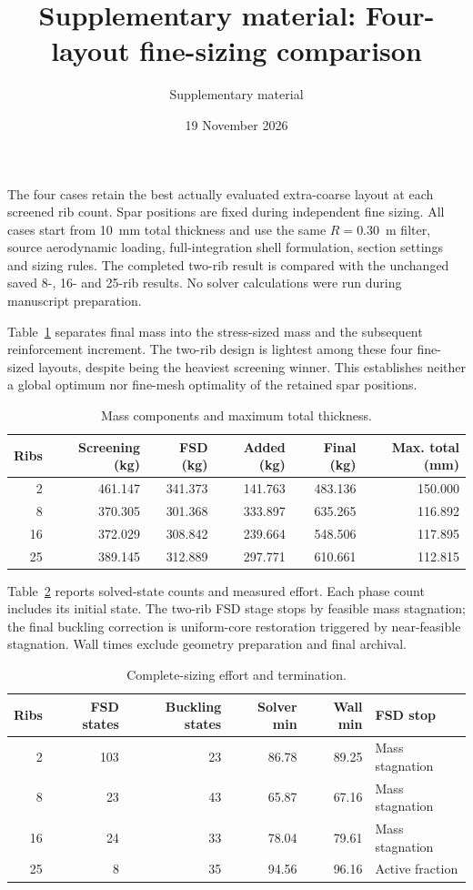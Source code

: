 \documentclass[11pt,a4paper]{article}
\title{Supplementary material: Four-layout fine-sizing comparison}
\author{Supplementary material}\date{19 November 2026}
\begin{document}
\maketitle
The four cases retain the best actually evaluated extra-coarse layout at each screened rib count. Spar positions are fixed during independent fine sizing. All cases start from 10~mm total thickness and use the same $R=0.30$~m filter, source aerodynamic loading, full-integration shell formulation, section settings and sizing rules. The completed two-rib result is compared with the unchanged saved 8-, 16- and 25-rib results. No solver calculations were run during manuscript preparation.

Table~\ref{tab:mass} separates final mass into the stress-sized mass and the subsequent reinforcement increment. The two-rib design is lightest among these four fine-sized layouts, despite being the heaviest screening winner. This establishes neither a global optimum nor fine-mesh optimality of the retained spar positions.
\begin{table}[h]\centering\small
\caption{Mass components and maximum total thickness.}\label{tab:mass}
\begin{tabular}{rrrrrr}\toprule
Ribs & Screening (kg) & FSD (kg) & Added (kg) & Final (kg) & Max. total (mm)\\\midrule
2 & 461.147 & 341.373 & 141.763 & 483.136 & 150.000\\
8 & 370.305 & 301.368 & 333.897 & 635.265 & 116.892\\
16 & 372.029 & 308.842 & 239.664 & 548.506 & 117.895\\
25 & 389.145 & 312.889 & 297.771 & 610.661 & 112.815\\
\bottomrule\end{tabular}\end{table}

Table~\ref{tab:effort} reports solved-state counts and measured effort. Each phase count includes its initial state. The two-rib FSD stage stops by feasible mass stagnation; the final buckling correction is uniform-core restoration triggered by near-feasible stagnation. Wall times exclude geometry preparation and final archival.
\begin{table}[h]\centering\small
\caption{Complete-sizing effort and termination.}\label{tab:effort}
\begin{tabular}{rrrrrl}\toprule
Ribs & FSD states & Buckling states & Solver min & Wall min & FSD stop\\\midrule
2 & 103 & 23 & 86.78 & 89.25 & Mass stagnation\\
8 & 23 & 43 & 65.87 & 67.16 & Mass stagnation\\
16 & 24 & 33 & 78.04 & 79.61 & Mass stagnation\\
25 & 8 & 35 & 94.56 & 96.16 & Active fraction\\
\bottomrule\end{tabular}\end{table}
\end{document}
